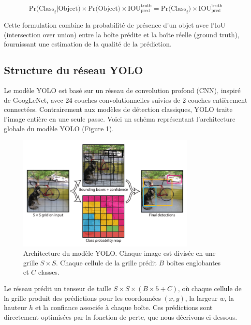 \documentclass[a4paper,11pt]{article}
\begin{document}
\begin{equation}
\text{Pr(Class}_i | \text{Object}) \times \text{Pr(Object)} \times \text{IOU}_{\text{pred}}^{\text{truth}} = \text{Pr(Class}_i) \times \text{IOU}_{\text{pred}}^{\text{truth}}
\end{equation}

Cette formulation combine la probabilité de présence d'un objet avec l'IoU (intersection over union) entre la boîte prédite et la boîte réelle (ground truth), fournissant une estimation de la qualité de la prédiction.

\subsection{Structure du réseau YOLO}
Le modèle YOLO est basé sur un réseau de convolution profond (CNN), inspiré de GoogLeNet, avec 24 couches convolutionnelles suivies de 2 couches entièrement connectées. Contrairement aux modèles de détection classiques, YOLO traite l'image entière en une seule passe. Voici un schéma représentant l'architecture globale du modèle YOLO (Figure \ref{fig:yolo}).

\begin{figure}[h]
    \centering
    \includegraphics[width=0.8\textwidth]{Images/yolo_architecture.PNG}
    \caption{Architecture du modèle YOLO. Chaque image est divisée en une grille $S \times S$. Chaque cellule de la grille prédit $B$ boîtes englobantes et $C$ classes.}
    \label{fig:yolo}
\end{figure}

Le réseau prédit un tenseur de taille $S \times S \times (B \times 5 + C)$, où chaque cellule de la grille produit des prédictions pour les coordonnées $(x, y)$, la largeur $w$, la hauteur $h$ et la confiance associée à chaque boîte. Ces prédictions sont directement optimisées par la fonction de perte, que nous décrivons ci-dessous.
\end{document}
